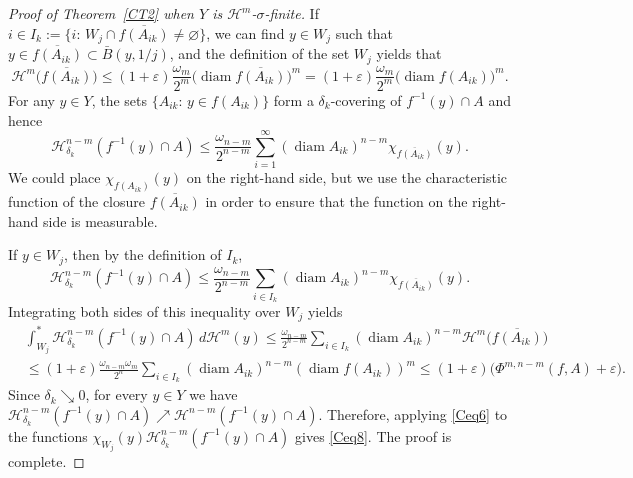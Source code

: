 \documentclass[12pt,leqno]{amsart}
\theoremstyle{definition}
\newcommand{\eps}{\varepsilon}
\def\diam{\operatorname{diam}}
\def\H{{\mathcal H}}
\numberwithin{theorem}{section} \numberwithin{equation}{section}
\begin{document}
\begin{proof}[Proof of {Theorem~\ref{CT2}} when $Y$ is $\H^m$-$\sigma$-finite]
If $i\in I_k:=\big\{i:\, W_j\cap\overline{f(A_{ik})}\neq\varnothing \big\}$, we can find $y\in W_j$ such that $y\in\overline{f(A_{ik})}\subset \bar{B}(y,1/j)$, and the definition of the set $W_j$ yields that
$$
\H^m\big(\overline{f(A_{ik})}\big)\leq
(1+\eps)\frac{\omega_m}{2^m}\big(\diam\overline{f(A_{ik})}\big)^m=
(1+\eps)\frac{\omega_m}{2^m}\big(\diam f(A_{ik})\big)^m.
$$
For any $y\in Y$, the sets $\{ A_{ik}:\, y\in f(A_{ik})\}$ form a $\delta_k$-covering of $f^{-1}(y)\cap A$ and hence
$$
\H^{n-m}_{\delta_k}(f^{-1}(y)\cap A)\leq
\frac{\omega_{n-m}}{2^{n-m}}\sum_{i=1}^\infty (\diam A_{ik})^{n-m}\chi_{\overline{f(A_{ik})}}(y).
$$
We could place $\chi_{f(A_{ik})}(y)$ on the right-hand side, but we use the characteristic function of the closure $\overline{f(A_{ik})}$ in order to ensure that the function on the right-hand side is measurable.

If $y\in W_j$, then by the definition of $I_k$,
$$
\H^{n-m}_{\delta_k}(f^{-1}(y)\cap A)\leq
\frac{\omega_{n-m}}{2^{n-m}}\sum_{i\in I_k} (\diam A_{ik})^{n-m}\chi_{\overline{f(A_{ik})}}(y).
$$
Integrating both sides of this inequality over $W_j$ yields
\begin{equation*}
\begin{split}
&
\int_{W_j}^*\H^{n-m}_{\delta_k}(f^{-1}(y)\cap A)\, d\H^m(y)\leq
\frac{\omega_{n-m}}{2^{n-m}}\sum_{i\in I_k} (\diam A_{ik})^{n-m} \H^{m}\big(\overline{f(A_{ik})}\big) \\
&\leq
(1+\eps)\frac{\omega_{n-m}\omega_m}{2^n}\sum_{i\in I_k}(\diam A_{ik})^{n-m}
(\diam f(A_{ik}))^m \leq
(1+\eps)\big(\Phi^{m,n-m}(f,A)+\eps\big).
\end{split}
\end{equation*}
Since $\delta_k\searrow 0$, for every $y\in Y$ we have $\H^{n-m}_{\delta_k}(f^{-1}(y)\cap A)\nearrow\H^{n-m}(f^{-1}(y)\cap A)$.
Therefore, applying \eqref{Ceq6} to the functions $\chi_{W_j}(y)\H^{n-m}_{\delta_k}(f^{-1}(y)\cap A)$
gives \eqref{Ceq8}. The proof is complete.
\end{proof}
\end{document}
